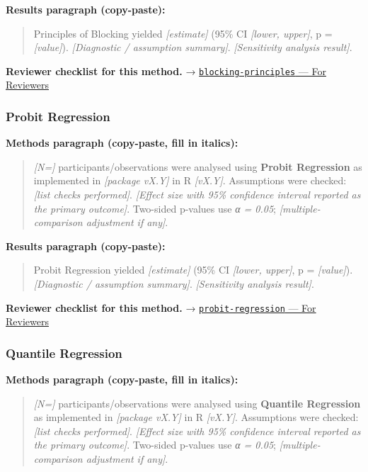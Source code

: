 \documentclass[
]{article}
\begin{document}
\textbf{Results paragraph (copy-paste):}

\begin{quote}
Principles of Blocking yielded \emph{{[}estimate{]}} (95\% CI
\emph{{[}lower, upper{]}}, p = \emph{{[}value{]}}). \emph{{[}Diagnostic
/ assumption summary{]}}. \emph{{[}Sensitivity analysis result{]}}.
\end{quote}

\textbf{Reviewer checklist for this method.} →
\href{../chapters/16-design/blocking-principles.Rmd\#for-reviewers}{\texttt{blocking-principles}
--- For Reviewers}

\subsubsection{Probit Regression}\label{probit-regression}

\textbf{Methods paragraph (copy-paste, fill in italics):}

\begin{quote}
\emph{{[}N={]}} participants/observations were analysed using
\textbf{Probit Regression} as implemented in \emph{{[}package vX.Y{]}}
in R \emph{{[}vX.Y{]}}. Assumptions were checked: \emph{{[}list checks
performed{]}}. \emph{{[}Effect size with 95\% confidence interval
reported as the primary outcome{]}}. Two-sided p-values use \emph{α =
0.05}; \emph{{[}multiple-comparison adjustment if any{]}}.
\end{quote}

\textbf{Results paragraph (copy-paste):}

\begin{quote}
Probit Regression yielded \emph{{[}estimate{]}} (95\% CI \emph{{[}lower,
upper{]}}, p = \emph{{[}value{]}}). \emph{{[}Diagnostic / assumption
summary{]}}. \emph{{[}Sensitivity analysis result{]}}.
\end{quote}

\textbf{Reviewer checklist for this method.} →
\href{../chapters/07-regression/probit-regression.Rmd\#for-reviewers}{\texttt{probit-regression}
--- For Reviewers}

\subsubsection{Quantile Regression}\label{quantile-regression}

\textbf{Methods paragraph (copy-paste, fill in italics):}

\begin{quote}
\emph{{[}N={]}} participants/observations were analysed using
\textbf{Quantile Regression} as implemented in \emph{{[}package vX.Y{]}}
in R \emph{{[}vX.Y{]}}. Assumptions were checked: \emph{{[}list checks
performed{]}}. \emph{{[}Effect size with 95\% confidence interval
reported as the primary outcome{]}}. Two-sided p-values use \emph{α =
0.05}; \emph{{[}multiple-comparison adjustment if any{]}}.
\end{quote}
\end{document}
